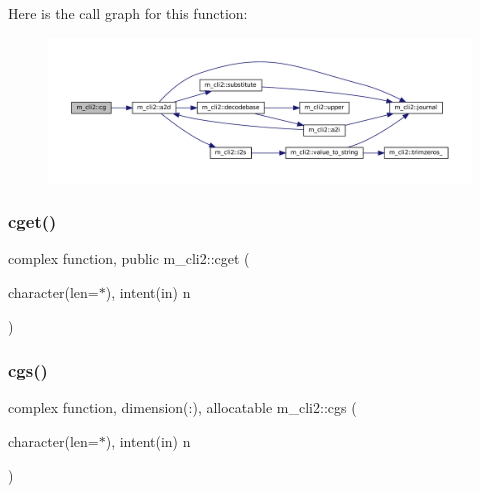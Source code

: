 Here is the call graph for this function\+:\nopagebreak
\begin{figure}[H]
\begin{center}
\leavevmode
\includegraphics[width=350pt]{namespacem__cli2_af45e2401f7c3c2309fe92882c1d5e521_cgraph}
\end{center}
\end{figure}
\mbox{\label{namespacem__cli2_a753fbd0c09fbfd712c7f4add246818cf}} 
\subsubsection{\texorpdfstring{cget()}{cget()}}
{\footnotesize\ttfamily complex function, public m\+\_\+cli2\+::cget (\begin{DoxyParamCaption}\item[{character(len=$\ast$), intent(in)}]{n }\end{DoxyParamCaption})}

\mbox{\label{namespacem__cli2_a05456ce2d696e1632be5efe8e7c2afe3}} 
\subsubsection{\texorpdfstring{cgs()}{cgs()}}
{\footnotesize\ttfamily complex function, dimension(\+:), allocatable m\+\_\+cli2\+::cgs (\begin{DoxyParamCaption}\item[{character(len=$\ast$), intent(in)}]{n }\end{DoxyParamCaption})\hspace{0.3cm}{\ttfamily [private]}}

\mbox{\label{namespacem__cli2_ada8b5e7a86778085f55821ec31c5977a}} 
